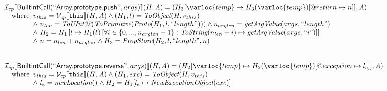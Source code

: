 \[\begin{array}{l}
\I _{cp}\lbr \SF{BuiltintCall}(``\SF{Array.prototype.push}",args)\rbr(H,A)
 = (H_3[\varloc{temp}\mapsto H_3(\varloc{temp})[\varprop{return}\mapsto n]], A) \\
\quad\wherec{
  v_{this} = \V _{cp}\lbr \TT{this}\rbr (H,A) \land (H_1,l) = \hf{ToObject}(H,v_{this})\\
  \land\ n_{len} = \hf{ToUInt32}(\hf{ToPrimitive}(\hf{Proto}(H_1, l, ``length")))
  \land n_{arglen} = \hf{getArgValue}(args, ``length")\\
  \land\ H_2 = H_1\left[ l \mapsto H_1(l)\left[\forall i \in \{0,...,n_{arglen}-1\}: 
    \hf{ToString}(n_{len}+i) \mapsto \hf{getArgValue}(args, ``i")\right]\right]\\
  \land\ n=n_{len} + n_{arglen}
  \land H_3 = \hf{PropStore}(H_2, l,``length", n)\\
  }\\
\\\\


\I _{cp}\lbr \SF{BuiltintCall}(``\SF{Array.prototype.reverse}",args)\rbr(H,A)
 = (H_2[\varloc{temp}\mapsto H_2(\varloc{temp})[\varprop{exception}\mapsto l_e]], A) \\
\quad\wherec{
  v_{this} = \V _{cp}\lbr \TT{this}\rbr (H,A) \land (H_1,exc) = \hf{ToObject}(H,v_{this})\\
  \land\ l_e = \hf{newLocation}() \land H_2=H_1[l_e\mapsto\hf{NewExceptionObject}(exc)] 
  }\\
  

\end{array}\]

